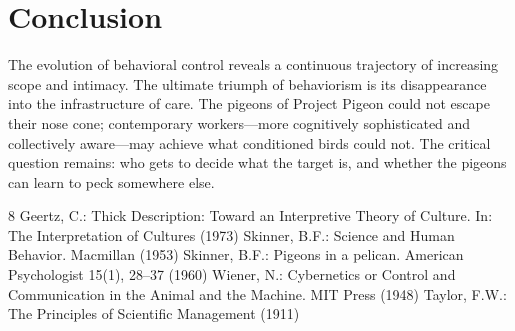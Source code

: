 \documentclass[11pt, a4paper]{article}
\begin{document}
\section{Conclusion}

The evolution of behavioral control reveals a continuous trajectory of increasing scope and intimacy. The ultimate triumph of behaviorism is its disappearance into the infrastructure of care. The pigeons of Project Pigeon could not escape their nose cone; contemporary workers—more cognitively sophisticated and collectively aware—may achieve what conditioned birds could not. The critical question remains: who gets to decide what the target is, and whether the pigeons can learn to peck somewhere else.

\begin{thebibliography}{8}
 Geertz, C.: Thick Description: Toward an Interpretive Theory of Culture. In: The Interpretation of Cultures (1973)
 Skinner, B.F.: Science and Human Behavior. Macmillan (1953)
 Skinner, B.F.: Pigeons in a pelican. American Psychologist 15(1), 28--37 (1960)
 Wiener, N.: Cybernetics or Control and Communication in the Animal and the Machine. MIT Press (1948)
 Taylor, F.W.: The Principles of Scientific Management (1911)
\end{thebibliography}
\end{document}
